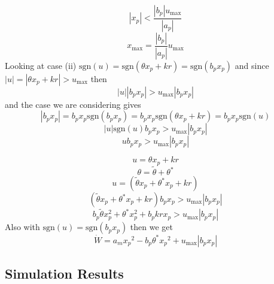 \begin{equation*}
  |x_{p}|<\frac{|b_{p}|u_{\text{max}}}{|a_{p}|}
\end{equation*}
\begin{equation*}
  x_{\max}=\frac{|b_{p}|}{|a_{p}|}u_{\text{max}}
\end{equation*}
Looking at case (ii) $\text{sgn}(u)=\text{sgn}(\theta x_{p}+kr)=\text{sgn}(b_{p}x_{p})$ and since $|u|=|\theta x_{p}+kr|>u_{\text{max}}$ then
\begin{equation*}
  |u||b_{p}x_{p}|>u_{\text{max}}|b_{p}x_{p}|
\end{equation*}
and the case we are considering gives
\begin{equation*}
  |b_{p}x_{p}|=b_{p}x_{p}\text{sgn}(b_{p}x_{p})=b_{p}x_{p}\text{sgn}(\theta x_{p}+kr)=b_{p}x_{p}\text{sgn}(u)
\end{equation*}
\begin{equation*}
  |u|\text{sgn}(u)b_{p}x_{p}>u_{\text{max}}|b_{p}x_{p}|
\end{equation*}
\begin{equation*}
  ub_{p}x_{p}>u_{\text{max}}|b_{p}x_{p}|
\end{equation*}

\begin{equation*}
  u=\theta x_{p}+kr
\end{equation*}
\begin{equation*}
  \theta=\tilde{\theta}+\theta^{*}
\end{equation*}
\begin{equation*}
  u=(\tilde{\theta}x_{p}+\theta^{*}x_{p}+kr)
\end{equation*}
\begin{equation*}
  (\tilde{\theta}x_{p}+\theta^{*}x_{p}+kr)b_{p}x_{p}>u_{\text{max}}|b_{p}x_{p}|
\end{equation*}
\begin{equation*}
  b_{p}\tilde{\theta}x_{p}^{2}+\theta^{*}x_{p}^{2}+b_{p}krx_{p}>u_{\text{max}}|b_{p}x_{p}|
\end{equation*}
Also with $\text{sgn}(u)=\text{sgn}(b_{p}x_{p})$ then we get
\begin{equation*}
  \dot{W}=a_{m}x_{p}{}^{2}-b_{p}\theta^{*}x_{p}{}^{2}+u_{\text{max}}|b_{p}x_{p}|
\end{equation*}

\subsection{Simulation Results}


